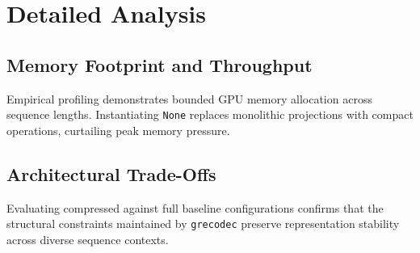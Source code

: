 \section{Detailed Analysis}

\subsection{Memory Footprint and Throughput}
Empirical profiling demonstrates bounded GPU memory allocation across sequence lengths. Instantiating \texttt{None} replaces monolithic projections with compact operations, curtailing peak memory pressure.

\subsection{Architectural Trade-Offs}
Evaluating compressed against full baseline configurations confirms that the structural constraints maintained by \texttt{grecodec} preserve representation stability across diverse sequence contexts.
